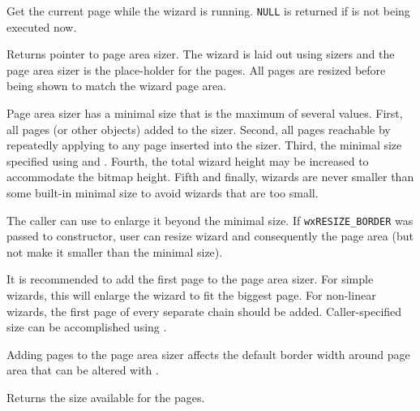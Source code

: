 \label{wxwizardgetcurrentpage}


Get the current page while the wizard is running. {\tt NULL} is returned if 
 is not being executed now.


\label{wxwizardgetpageareasizer}


Returns pointer to page area sizer. The wizard is laid out using sizers and
the page area sizer is the place-holder for the pages. All pages are resized before
being shown to match the wizard page area.

Page area sizer has a minimal size that is the maximum of several values. First,
all pages (or other objects) added to the sizer. Second, all pages reachable
by repeatedly applying 
 to
any page inserted into the sizer. Third,
the minimal size specified using  and 
. Fourth, the total wizard height may
be increased to accommodate the bitmap height. Fifth and finally, wizards are
never smaller than some built-in minimal size to avoid wizards that are too small.

The caller can use  to enlarge it
beyond the minimal size. If {\tt wxRESIZE\_BORDER} was passed to constructor, user
can resize wizard and consequently the page area (but not make it smaller than the
minimal size).

It is recommended to add the first page to the page area sizer. For simple wizards,
this will enlarge the wizard to fit the biggest page. For non-linear wizards,
the first page of every separate chain should be added. Caller-specified size
can be accomplished using .

Adding pages to the page area sizer affects the default border width around page
area that can be altered with .


\label{wxwizardgetpagesize}


Returns the size available for the pages.


